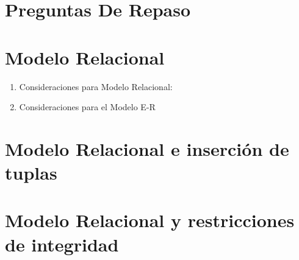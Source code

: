 \documentclass[11pt,letterpaper,spanish]{article}
\begin{document}
\section*{Preguntas De Repaso}


\section*{Modelo Relacional}
\begin{enumerate}
    \item Consideraciones para Modelo Relacional:
    

    \item  Consideraciones para el Modelo E-R
    
\end{enumerate}

\section*{Modelo Relacional e inserción de tuplas}


\section*{Modelo Relacional y restricciones de integridad}


\printbibliography
\end{document}

